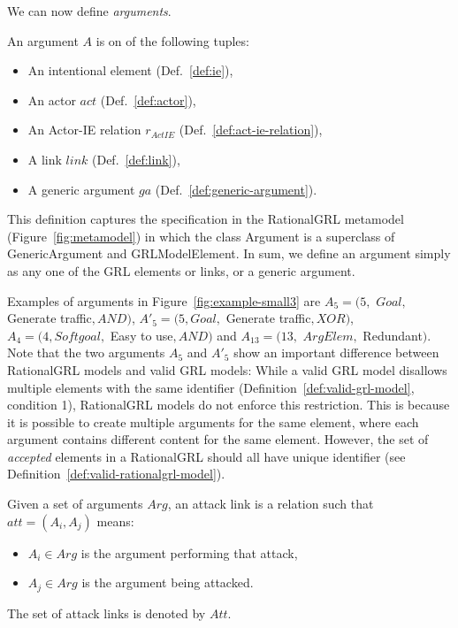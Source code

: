 We can now define \emph{arguments}. 

\begin{definition}[Argument]
\label{def:argument}
An argument $A$ is on of the following tuples:
\begin{itemize}
\item An intentional element (Def.~\ref{def:ie}), 
\item An actor $act$ (Def.~\ref{def:actor}),
\item An Actor-IE relation $r_{ActIE}$ (Def.~\ref{def:act-ie-relation}), 
\item A link $link$ (Def.~\ref{def:link}),
\item A generic argument $ga$ (Def.~\ref{def:generic-argument}).
\end{itemize}
\end{definition}

This definition captures the specification in the RationalGRL metamodel (Figure~\ref{fig:metamodel}) in which the class \textsf{Argument} is a superclass of \textsf{GenericArgument} and \textsf{GRLModelElement}. In sum, we define an argument simply as any one of the GRL elements or links, or a generic argument. 

Examples of arguments in Figure~\ref{fig:example-small3} are $A_5 = (5,$ $Goal,$ Generate traffic$, AND)$, $A'_5 = (5, Goal,$ Generate traffic$, XOR)$, $A_4 = (4, Softgoal,$ Easy to use$, AND)$ and $A_{13}=(13,$ $ArgElem,$ Redundant$)$. Note that the two arguments $A_5$ and $A'_5$ show an important difference between RationalGRL models and valid GRL models: While a valid GRL model disallows multiple elements with the same identifier (Definition~\ref{def:valid-grl-model}, condition 1), RationalGRL models do not enforce this restriction. This is because it is possible to create multiple arguments for the same element, where each argument contains different content for the same element. However, the set of \emph{accepted} elements in a RationalGRL should all have unique identifier (see Definition~\ref{def:valid-rationalgrl-model}).

\begin{definition}
\label{def:link:attack}
Given a set of arguments $Arg$, an attack link is a relation such that $att=(A_i,A_j)$ means:
\begin{itemize}
\item $A_i\in Arg$ is the argument performing that attack,
\item $A_j\in Arg$ is the argument being attacked.
\end{itemize}
The set of attack links is denoted by $Att$.
\end{definition}

